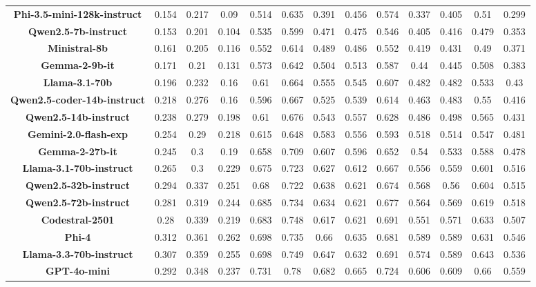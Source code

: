 \begin{table*}[t]
{\begin{tabular}{ccccccccccccc}
\textbf{Phi-3.5-mini-128k-instruct} & 0.154 & 0.217 & 0.09 & 0.514 & 0.635 & 0.391 & 0.456 & 0.574 & 0.337 & 0.405 & 0.51 & 0.299\\
\textbf{Qwen2.5-7b-instruct} & 0.153 & 0.201 & 0.104 & 0.535 & 0.599 & 0.471 & 0.475 & 0.546 & 0.405 & 0.416 & 0.479 & 0.353\\
\textbf{Ministral-8b} & 0.161 & 0.205 & 0.116 & 0.552 & 0.614 & 0.489 & 0.486 & 0.552 & 0.419 & 0.431 & 0.49 & 0.371\\
\textbf{Gemma-2-9b-it} & 0.171 & 0.21 & 0.131 & 0.573 & 0.642 & 0.504 & 0.513 & 0.587 & 0.44 & 0.445 & 0.508 & 0.383\\
\textbf{Llama-3.1-70b} & 0.196 & 0.232 & 0.16 & 0.61 & 0.664 & 0.555 & 0.545 & 0.607 & 0.482 & 0.482 & 0.533 & 0.43\\
\textbf{Qwen2.5-coder-14b-instruct} & 0.218 & 0.276 & 0.16 & 0.596 & 0.667 & 0.525 & 0.539 & 0.614 & 0.463 & 0.483 & 0.55 & 0.416\\
\textbf{Qwen2.5-14b-instruct} & 0.238 & 0.279 & 0.198 & 0.61 & 0.676 & 0.543 & 0.557 & 0.628 & 0.486 & 0.498 & 0.565 & 0.431\\
\textbf{Gemini-2.0-flash-exp} & 0.254 & 0.29 & 0.218 & 0.615 & 0.648 & 0.583 & 0.556 & 0.593 & 0.518 & 0.514 & 0.547 & 0.481\\
\textbf{Gemma-2-27b-it} & 0.245 & 0.3 & 0.19 & 0.658 & 0.709 & 0.607 & 0.596 & 0.652 & 0.54 & 0.533 & 0.588 & 0.478\\
\textbf{Llama-3.1-70b-instruct} & 0.265 & 0.3 & 0.229 & 0.675 & 0.723 & 0.627 & 0.612 & 0.667 & 0.556 & 0.559 & 0.601 & 0.516\\
\textbf{Qwen2.5-32b-instruct} & 0.294 & 0.337 & 0.251 & 0.68 & 0.722 & 0.638 & 0.621 & 0.674 & 0.568 & 0.56 & 0.604 & 0.515\\
\textbf{Qwen2.5-72b-instruct} & 0.281 & 0.319 & 0.244 & 0.685 & 0.734 & 0.634 & 0.621 & 0.677 & 0.564 & 0.569 & 0.619 & 0.518\\
\textbf{Codestral-2501} & 0.28 & 0.339 & 0.219 & 0.683 & 0.748 & 0.617 & 0.621 & 0.691 & 0.551 & 0.571 & 0.633 & 0.507\\
\textbf{Phi-4} & 0.312 & 0.361 & 0.262 & 0.698 & 0.735 & 0.66 & 0.635 & 0.681 & 0.589 & 0.589 & 0.631 & 0.546\\
\textbf{Llama-3.3-70b-instruct} & 0.307 & 0.359 & 0.255 & 0.698 & 0.749 & 0.647 & 0.632 & 0.691 & 0.574 & 0.589 & 0.643 & 0.536\\
\textbf{GPT-4o-mini} & 0.292 & 0.348 & 0.237 & 0.731 & 0.78 & 0.682 & 0.665 & 0.724 & 0.606 & 0.609 & 0.66 & 0.559\\

\end{tabular}}
\end{table*}
